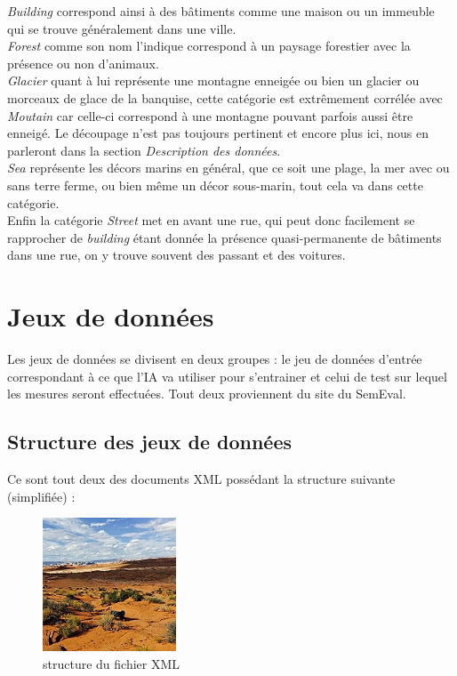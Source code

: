 \documentclass[12pt ,a4paper ]{article}
\begin{document}
\begin{multicols}{2}
\bigskip
\textit{Building} correspond ainsi à des bâtiments comme une maison ou un immeuble qui se trouve généralement dans une ville. \\
\textit{Forest} comme son nom l'indique correspond à un paysage forestier avec la présence ou non d'animaux. \\
\textit{Glacier} quant à lui représente une montagne enneigée ou bien un glacier ou morceaux de glace de la banquise, cette catégorie est extrêmement corrélée avec \textit{Moutain} car celle-ci correspond à une montagne pouvant parfois aussi être enneigé. Le découpage n'est pas toujours pertinent et encore plus ici, nous en parleront dans la section \textit{Description des données}.\\
 \textit{Sea} représente les décors marins en général, que ce soit une plage, la mer avec ou sans terre ferme, ou bien même un décor sous-marin, tout cela va dans cette catégorie. \\
Enfin la catégorie \textit{Street} met en avant une rue, qui peut donc facilement se rapprocher de \textit{building} étant donnée la présence quasi-permanente de bâtiments dans une rue, on y trouve souvent des passant et des voitures.  

\section{Jeux de données}
Les jeux de données se divisent en deux groupes : le jeu de données d'entrée correspondant à ce que l'IA va utiliser pour s'entrainer et celui de test sur lequel les mesures seront effectuées. Tout deux proviennent du site du SemEval. 

\subsection{Structure des jeux de données}
\noindent Ce sont tout deux des documents XML possédant la structure suivante (simplifiée) :  

\begin{figure}[H]
\begin{center}
\includegraphics[scale=0.55]{3808.jpg}
\caption{\small{structure du fichier XML}}
\end{center}
\end{figure}


\end{multicols}
\end{document}
